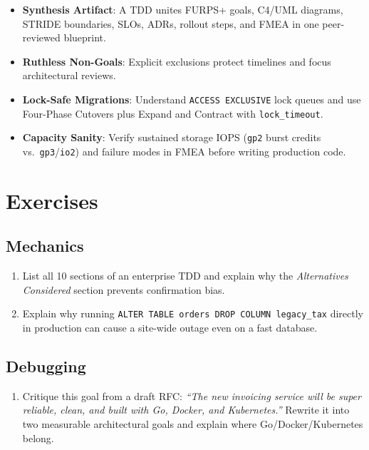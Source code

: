\begin{itemize}[leftmargin=18pt]
  \item \textbf{Synthesis Artifact}: A TDD unites FURPS+ goals, C4/UML diagrams, STRIDE boundaries, SLOs, ADRs, rollout steps, and FMEA in one peer-reviewed blueprint.
  \item \textbf{Ruthless Non-Goals}: Explicit exclusions protect timelines and focus architectural reviews.
  \item \textbf{Lock-Safe Migrations}: Understand \texttt{ACCESS EXCLUSIVE} lock queues and use Four-Phase Cutovers plus Expand and Contract with \texttt{lock\_timeout}.
  \item \textbf{Capacity Sanity}: Verify sustained storage IOPS (\texttt{gp2} burst credits vs.\ \texttt{gp3}/\texttt{io2}) and failure modes in FMEA before writing production code.
\end{itemize}

\section{Exercises}

\subsection*{Mechanics}
\begin{enumerate}[label=\textbf{Exercise~\thechapter.\arabic*}, leftmargin=*]
  \item List all 10 sections of an enterprise TDD and explain why the \emph{Alternatives Considered} section prevents confirmation bias.
  \item Explain why running \texttt{ALTER TABLE orders DROP COLUMN legacy\_tax} directly in production can cause a site-wide outage even on a fast database.
\end{enumerate}

\subsection*{Debugging}
\begin{enumerate}[label=\textbf{Exercise~\thechapter.\arabic*}, leftmargin=*, start=3]
  \item Critique this goal from a draft RFC: \textit{``The new invoicing service will be super reliable, clean, and built with Go, Docker, and Kubernetes.''} Rewrite it into two measurable architectural goals and explain where Go/Docker/Kubernetes belong.
\end{enumerate}

